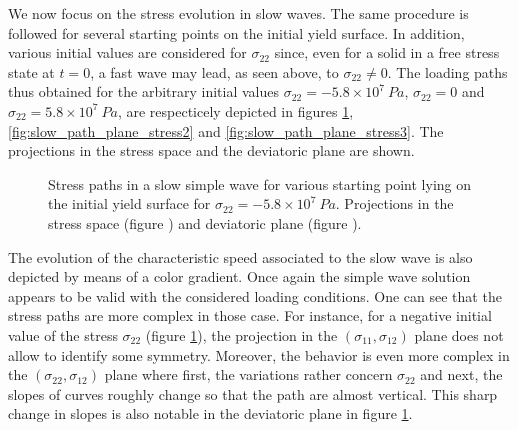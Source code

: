 We now focus on the stress evolution in slow waves.
The same procedure is followed for several starting points on the initial yield surface.
In addition, various initial values are considered for $\sigma_{22}$ since, even for a solid in a free stress state at $t=0$, a fast wave may lead, as seen above, to $\sigma_{22}\neq 0$.
The loading paths thus obtained for the arbitrary initial values $\sigma_{22}=-5.8\times 10^7 \: Pa$, $\sigma_{22}=0$ and $\sigma_{22}=5.8\times 10^7 \: Pa$, are respecticely depicted in figures \ref{fig:slow_path_plane_stress1}, \ref{fig:slow_path_plane_stress2} and \ref{fig:slow_path_plane_stress3}.
The projections in the stress space and the deviatoric plane are shown.
\begin{figure}[h!]
  \centering
  \caption{Stress paths in a slow simple wave for various starting point lying on the initial yield surface for $\sigma_{22}=-5.8\times 10^7 \: Pa$. Projections in the stress space (figure )  and deviatoric plane (figure ).}
  \label{fig:slow_path_plane_stress1}
\end{figure}
The evolution of the characteristic speed associated to the slow wave is also depicted by means of a color gradient.
Once again the simple wave solution appears to be valid with the considered loading conditions.
One can see that the stress paths are more complex in those case.
For instance, for a negative initial value of the stress $\sigma_{22}$ (figure \ref{fig:slow_path_plane_stress1}), the projection in the $(\sigma_{11},\sigma_{12})$ plane does not allow to identify some symmetry.
Moreover, the behavior is even more complex in the $(\sigma_{22},\sigma_{12})$ plane where first, the variations rather concern $\sigma_{22}$ and next, the slopes of curves roughly change so that the path are almost vertical.
This sharp change in slopes is also notable in the deviatoric plane in figure \ref{fig:slow_path_plane_stress1}.

